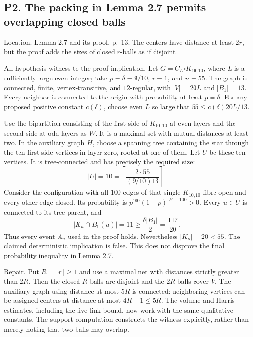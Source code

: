 \documentclass[10pt]{article}
\begin{document}
\subsection*{P2. The packing in Lemma 2.7 permits overlapping closed balls}
Location. Lemma 2.7 and its proof, p. 13. The centers have distance at least \(2r\), but the proof adds the sizes of closed \(r\)-balls as if disjoint.\par
All-hypothesis witness to the proof implication. Let \(G=C_L\square K_{10,10}\), where \(L\) is a sufficiently large even integer; take \(p=\delta=9/10\), \(r=1\), and \(n=55\). The graph is connected, finite, vertex-transitive, and \(12\)-regular, with \(|V|=20L\) and \(|B_1|=13\). Every neighbor is connected to the origin with probability at least \(p=\delta\). For any proposed positive constant \(c(\delta)\), choose even \(L\) so large that \(55\le c(\delta)20L/13\).\par
Use the bipartition consisting of the first side of \(K_{10,10}\) at even layers and the second side at odd layers as \(W\). It is a maximal set with mutual distances at least two. In the auxiliary graph \(H\), choose a spanning tree containing the star through the ten first-side vertices in layer zero, rooted at one of them. Let \(U\) be these ten vertices. It is tree-connected and has precisely the required size: \[|U|=10=\left\lceil\frac{2\cdot55}{(9/10)13}\right\rceil.\] Consider the configuration with all \(100\) edges of that single \(K_{10,10}\) fibre open and every other edge closed. Its probability is \(p^{100}(1-p)^{|E|-100}>0\). Every \(u\in U\) is connected to its tree parent, and \[|K_u\cap B_1(u)|=11\ge\frac{\delta|B_1|}{2}=\frac{117}{20}.\] Thus every event \(A_u\) used in the proof holds. Nevertheless \(|K_o|=20<55\). The claimed deterministic implication is false. This does not disprove the final probability inequality in Lemma 2.7.\par
Repair. Put \(R=\lfloor r\rfloor\ge1\) and use a maximal net with distances strictly greater than \(2R\). Then the closed \(R\)-balls are disjoint and the \(2R\)-balls cover \(V\). The auxiliary graph using distance at most \(5R\) is connected: neighboring vertices can be assigned centers at distance at most \(4R+1\le5R\). The volume and Harris estimates, including the five-link bound, now work with the same qualitative constants. The support computation constructs the witness explicitly, rather than merely noting that two balls may overlap.\par
\end{document}
